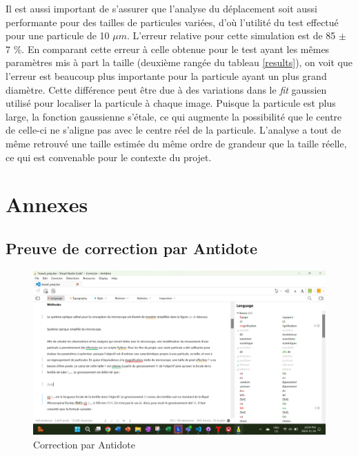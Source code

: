 \documentclass[conference]{IEEEtran}
\begin{document}
Il est aussi important de s'assurer que l'analyse du déplacement soit aussi performante pour des tailles de particules variées, d'où l'utilité du test 
effectué pour une particule de 10 $\mu m$. L'erreur relative pour cette simulation est de 85 $\pm$ 7 \%. En comparant cette erreur à celle obtenue pour le test ayant les mêmes paramètres mis à part la taille (deuxième
rangée du tableau \ref{results}), on voit que l'erreur est beaucoup plus importante pour la particule ayant un plus grand diamètre. Cette différence peut être due à des variations dans le \textit{fit} gaussien utilisé pour localiser
la particule à chaque image. Puisque la particule est plus large, la fonction gaussienne s'étale, ce qui augmente la possibilité que le centre de celle-ci ne s'aligne pas
avec le centre réel de la particule. L'analyse a tout de même retrouvé une taille estimée du même ordre de grandeur que la taille réelle, ce qui est convenable pour le contexte du projet.

\printbibliography

\clearpage

\section{Annexes}

\subsection{Preuve de correction par Antidote}
\begin{figure}[H]
  \centering
  \includegraphics[scale=0.1]{Screenshot (113).png}
  \caption{Correction par Antidote}
\end{figure}
\clearpage
\end{document}
